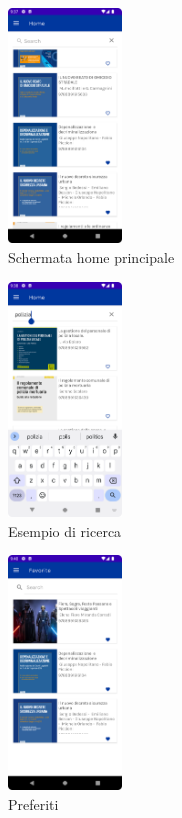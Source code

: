 \begin{multicols}{3}
            \begin{figure}[H]
                \centering
                \includegraphics[width=0.27\textwidth]{img/home.png}
                \caption{Schermata home principale}
                \label{home-android}
            \end{figure}
            
            \begin{figure}[H]
                \centering
                \includegraphics[width=0.27\textwidth]{img/ricerca.png}
                \caption{Esempio di ricerca}
                \label{ricerca-android}
            \end{figure}

            \begin{figure}[H]
                \centering
                \includegraphics[width=0.27\textwidth]{img/preferiti.png}
                \caption{Preferiti}
                \label{preferiti-android}
            \end{figure}


\end{multicols}
